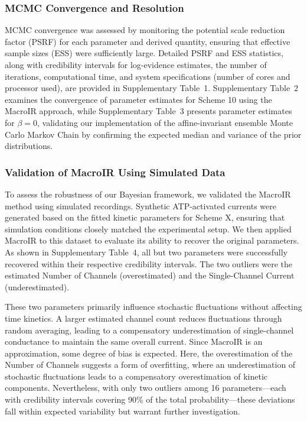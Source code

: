 \documentclass[pdflatex,sn-nature]{sn-jnl}%
\begin{document}
\subsubsection{MCMC Convergence and Resolution}  
MCMC convergence was assessed by monitoring the potential scale reduction factor (PSRF) for each parameter and derived quantity, ensuring that effective sample sizes (ESS) were sufficiently large. Detailed PSRF and ESS statistics, along with credibility intervals for log-evidence estimates, the number of iterations, computational time, and system specifications (number of cores and processor used), are provided in Supplementary Table~1. Supplementary Table~2 examines the convergence of parameter estimates for Scheme 10 using the MacroIR approach, while Supplementary Table~3 presents parameter estimates for \(\beta=0\), validating our implementation of the affine-invariant ensemble Monte Carlo Markov Chain by confirming the expected median and variance of the prior distributions.
\subsubsection{Validation of MacroIR Using Simulated Data}  
To assess the robustness of our Bayesian framework, we validated the MacroIR method using simulated recordings. Synthetic ATP-activated currents were generated based on the fitted kinetic parameters for Scheme X, ensuring that simulation conditions closely matched the experimental setup. We then applied MacroIR to this dataset to evaluate its ability to recover the original parameters. As shown in Supplementary Table~4, all but two parameters were successfully recovered within their respective credibility intervals. The two outliers were the estimated Number of Channels (overestimated) and the Single-Channel Current (underestimated).  

These two parameters primarily influence stochastic fluctuations without affecting time kinetics. A larger estimated channel count reduces fluctuations through random averaging, leading to a compensatory underestimation of single-channel conductance to maintain the same overall current. Since MacroIR is an approximation, some degree of bias is expected. Here, the overestimation of the Number of Channels suggests a form of overfitting, where an underestimation of stochastic fluctuations leads to a compensatory overestimation of kinetic components. Nevertheless, with only two outliers among 16 parameters—each with credibility intervals covering 90\% of the total probability—these deviations fall within expected variability but warrant further investigation.
\end{document}

